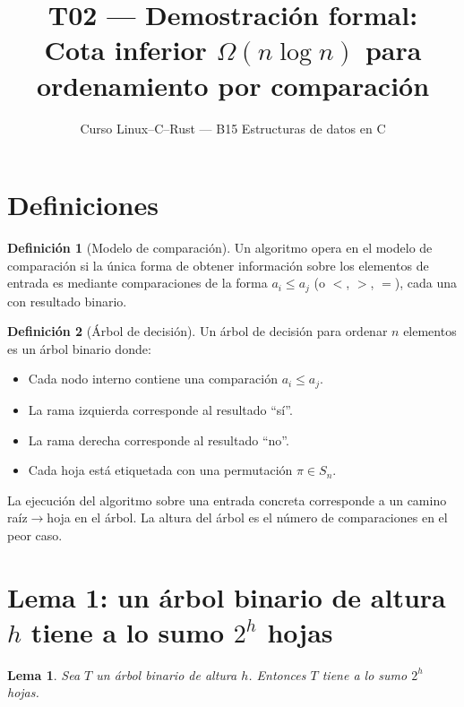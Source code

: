 \documentclass[11pt, letterpaper]{article}
\title{%
  T02 --- Demostración formal:\\[4pt]
  Cota inferior $\Omega(n \log n)$ para ordenamiento por comparación
}
\author{Curso Linux--C--Rust --- B15 Estructuras de datos en C}
\date{}
\theoremstyle{definition}
\newtheorem{definition}{Definición}[section]
\theoremstyle{plain}
\newtheorem{lemma}[theorem]{Lema}
\theoremstyle{remark}
\begin{document}
\maketitle
\tableofcontents

\section{Definiciones}

\begin{definition}[Modelo de comparación]
Un algoritmo opera en el modelo de comparación si la única forma de
obtener información sobre los elementos de entrada es mediante
comparaciones de la forma $a_i \leq a_j$ (o $<$, $>$, $=$), cada una
con resultado binario.
\end{definition}

\begin{definition}[Árbol de decisión]
Un árbol de decisión para ordenar $n$ elementos es un árbol binario
donde:
\begin{itemize}
  \item Cada nodo interno contiene una comparación $a_i \leq a_j$.
  \item La rama izquierda corresponde al resultado ``sí''.
  \item La rama derecha corresponde al resultado ``no''.
  \item Cada hoja está etiquetada con una permutación
    $\pi \in S_n$.
\end{itemize}
La ejecución del algoritmo sobre una entrada concreta corresponde a un
camino raíz$\to$hoja en el árbol. La altura del árbol es el número de
comparaciones en el peor caso.
\end{definition}

\section{Lema 1: un árbol binario de altura $h$ tiene a lo sumo
  \texorpdfstring{$2^h$}{2\^h} hojas}

\begin{lemma}\label{lem:leaves}
Sea $T$ un árbol binario de altura $h$. Entonces $T$ tiene a lo sumo
$2^h$ hojas.
\end{lemma}
\end{document}
